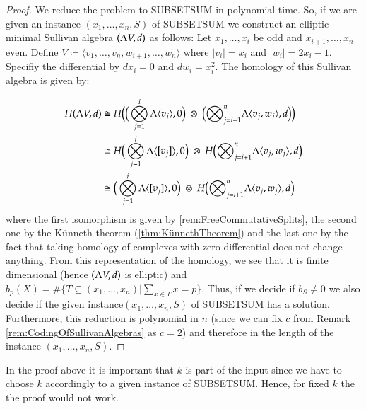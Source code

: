  \begin{proof}
  We reduce the problem to SUBSETSUM in polynomial time.
  So, if we are given an instance $(x_1, \ldots, x_n, S)$ of SUBSETSUM we construct an elliptic minimal Sullivan
  algebra $(\Lambda V,d)$ as follows: \newline
  Let $x_1, \ldots, x_i$ be odd and $x_{i+1}, \ldots, x_n$ even. Define 
  $V \coloneqq \langle v_1, \ldots, v_n, w_{i+1}, \ldots , w_n \rangle$ where $|v_i| = x_i$ and $|w_i| = 2x_i -1$.
  Specifiy the differential by $dx_i = 0$ and $dw_i = x_i^2$. The homology of this Sullivan algebra is given by:
   
  \begin{align*}
  H (\Lambda V,d) &\cong H \big{(} \big{(}\bigotimes_{j = 1}^i \Lambda \langle v_j \rangle , 0 \big{)} \;\otimes \;  
  \big{(} {\bigotimes}_{j=i + 1}^n \Lambda \langle v_{j} ,w_{j}\rangle , d \big{)} \big{)}  \\
  &\cong H\big{(} \bigotimes_{j = 1}^i \Lambda \langle [v_j] \rangle , 0 \big{)}
  \; \otimes \;H \big{(}  {\bigotimes}_{j=i + 1}^n \Lambda \langle v_{j} ,w_{j}\rangle  , d\big{)} \\ 
  &\cong \big{(} \bigotimes_{j = 1}^i \Lambda \langle [v_j] \rangle , 0 \big{)}
  \; \otimes \;H \big{(}  {\bigotimes}_{j=i + 1}^n \Lambda \langle v_{j} ,w_{j}\rangle  , d\big{)}
  \end{align*}
  where the first isomorphism is given by \ref{rem:FreeCommutativeSplits}, the second one by the Künneth theorem
  (\ref{thm:KünnethTheorem})
  and the last one by the fact that taking homology of complexes with zero differential does not change anything.
  From this representation of the homology,
  we see that it is finite dimensional (hence $(\Lambda V,d)$ is elliptic) and 
  ${b_p(X) = \# {\lbrace T \subseteq (x_1, \ldots, x_n) | \sum_{x \in T} x = p \rbrace}}$.
  Thus, if we decide if $b_S \neq 0$ we also decide if the given instance$(x_1, \ldots, x_n, S)$ of SUBSETSUM
  has a solution. Furthermore, this reduction is polynomial in $n$ 
  (since we can fix $c$ from Remark \ref{rem:CodingOfSullivanAlgebras} as $c = 2$)
  and therefore in the length of the instance $(x_1, \ldots, x_n, S)$. 
 \end{proof}

 \begin{Remark}
  In the proof above it is important that $k$ is part of the input since we have to choose $k$ accordingly
  to a given instance of SUBSETSUM. Hence, for fixed $k$ the the proof would not work.
 \end{Remark}

